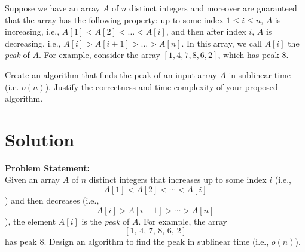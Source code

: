 \documentclass[11pt]{article}
\begin{document}
    \setlength{\headheight}{26pt}
    \pagestyle{fancy}
    \fancyfoot[C]{}
    \fancyfoot[R]{\thepage}
    \renewcommand{\headrulewidth}{0.4pt}
    \renewcommand{\footrulewidth}{0.4 pt}
    
	
    
    \begin{tcolorbox}[title={Problem 1 (Divide and Conquer the Peak, 30 pts)}]
        Suppose we have an array $A$ of $n$ distinct integers and moreover are guaranteed that the array has the following property: up to some index $1\leq i \leq n$, $A$ is increasing, i.e., $A[1] < A[2] < \ldots < A[i]$, and then after index $i$, $A$ is decreasing, i.e., $A[i] > A[i+1] > \ldots > A[n]$. In this array, we call $A[i]$ the \emph{peak} of $A$. For example, consider the array $[1, 4, 7, 8, 6, 2]$, which has peak $8$. 
        \medskip
        
        Create an algorithm that finds the peak of an input array $A$ in sublinear time (i.e. $o(n)$). Justify the correctness and time complexity of your proposed algorithm.
    \end{tcolorbox}
    \section*{Solution}

    \textbf{Problem Statement:} \\
    Given an array \( A \) of \( n \) distinct integers that increases up to some index \( i \) (i.e., 
    \[
    A[1] < A[2] < \cdots < A[i]
    \]
    ) and then decreases (i.e., 
    \[
    A[i] > A[i+1] > \cdots > A[n]
    \]
    ), the element \( A[i] \) is the \emph{peak} of \( A \). For example, the array 
    \[
    [1,\, 4,\, 7,\, 8,\, 6,\, 2]
    \]
    has peak \( 8 \). Design an algorithm to find the peak in sublinear time (i.e., \( o(n) \)).
    
    \bigskip
    
\end{document}
